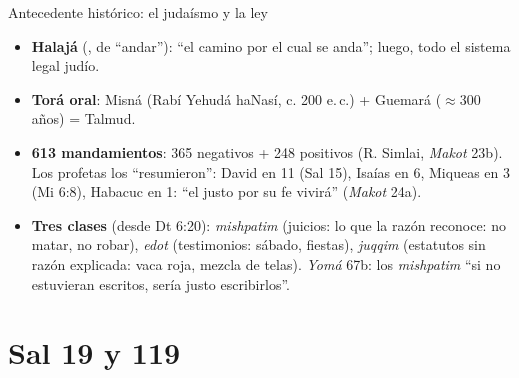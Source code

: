\begin{frame}{Antecedente histórico: el judaísmo y la ley}
\begin{tcolorbox}[colback=dorado!10,colframe=dorado!85!azul,boxrule=0.6pt,arc=2pt,fontupper=\scriptsize,title={\scriptsize No es la justicia de Dios declarada en la Biblia: es cómo la tradición posterior organizó la ley},coltitle=azuloscuro,colbacktitle=dorado!30]
\begin{itemize}\setlength{\itemsep}{1pt}
\item \textbf{Halajá} (, de  ``andar''): ``el camino por el cual se anda''; luego, todo el sistema legal judío.
\item \textbf{Torá oral}: Misná (Rabí Yehudá haNasí, c. 200 e.\,c.) + Guemará ($\approx$300 años) = Talmud.
\item \textbf{613 mandamientos}: 365 negativos + 248 positivos (R. Simlai, \emph{Makot} 23b). Los profetas los ``resumieron'': David en 11 (Sal 15), Isaías en 6, Miqueas en 3 (Mi 6:8), Habacuc en 1: ``el justo por su fe vivirá'' (\emph{Makot} 24a).
\item \textbf{Tres clases} (desde Dt 6:20): \emph{mishpatim} (juicios: lo que la razón reconoce: no matar, no robar), \emph{edot} (testimonios: sábado, fiestas), \emph{juqqim} (estatutos sin razón explicada: vaca roja, mezcla de telas). \emph{Yomá} 67b: los \emph{mishpatim} ``si no estuvieran escritos, sería justo escribirlos''.
\end{itemize}
\end{tcolorbox}
\end{frame}

\section{Sal 19 y 119}

